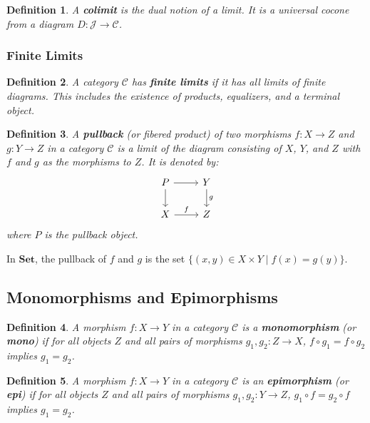 \documentclass{article}
\newtheorem{definition}{Definition}[section]
\begin{document}
\begin{definition}
    A \textbf{colimit} is the dual notion of a limit. It is a universal cocone from a diagram $D \colon \mathcal{J} \to \mathcal{C}$.
\end{definition}

\subsubsection{Finite Limits}

\begin{definition}
    A category $\mathcal{C}$ has \textbf{finite limits} if it has all limits of finite diagrams. This includes the existence of products, equalizers, and a terminal object.
\end{definition}

\begin{definition}
    A \textbf{pullback} (or fibered product) of two morphisms $f \colon X \to Z$ and $g \colon Y \to Z$ in a category $\mathcal{C}$ is a limit of the diagram consisting of $X$, $Y$, and $Z$ with $f$ and $g$ as the morphisms to $Z$. It is denoted by:
    \[
        \begin{tikzcd}
            P \arrow[r] \arrow[d] & Y \arrow[d, "g"] \\
            X \arrow[r, "f"] & Z
        \end{tikzcd}
    \]
    where $P$ is the pullback object.
\end{definition}

In $\mathbf{Set}$, the pullback of $f$ and $g$ is the set $\{ (x,y) \in X \times Y \mid f(x) = g(y) \}$.

\subsection{Monomorphisms and Epimorphisms}

\begin{definition}
    A morphism $f \colon X \to Y$ in a category $\mathcal{C}$ is a \textbf{monomorphism} (or \textbf{mono}) if for all objects $Z$ and all pairs of morphisms $g_1, g_2 \colon Z \to X$, $f \circ g_1 = f \circ g_2$ implies $g_1 = g_2$.
\end{definition}

\begin{definition}
    A morphism $f \colon X \to Y$ in a category $\mathcal{C}$ is an \textbf{epimorphism} (or \textbf{epi}) if for all objects $Z$ and all pairs of morphisms $g_1, g_2 \colon Y \to Z$, $g_1 \circ f = g_2 \circ f$ implies $g_1 = g_2$.
\end{definition}
\end{document}
